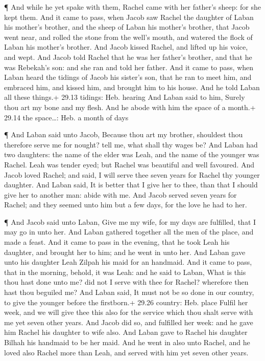  ¶ And while he yet spake with them, Rachel came with her
father's sheep: for she kept them.  And it came to pass,
when Jacob saw Rachel the daughter of Laban his mother's brother, and
the sheep of Laban his mother's brother, that Jacob went near, and
rolled the stone from the well's mouth, and watered the flock of Laban
his mother's brother.  And Jacob kissed Rachel, and lifted
up his voice, and wept.  And Jacob told Rachel that he was
her father's brother, and that he was Rebekah's son: and she ran and
told her father.  And it came to pass, when Laban heard the
tidings of Jacob his sister's son, that he ran to meet him, and embraced
him, and kissed him, and brought him to his house. And he told Laban all
these things.+ 29.13 tidings: Heb. hearing  And Laban said
to him, Surely thou art my bone and my flesh. And he abode with him the
space of a month.+ 29.14 the space\ldots: Heb. a month of days

 ¶ And Laban said unto Jacob, Because thou art my brother,
shouldest thou therefore serve me for nought? tell me, what shall thy
wages be?  And Laban had two daughters: the name of the
elder was Leah, and the name of the younger was Rachel. 
Leah was tender eyed; but Rachel was beautiful and well favoured.
 And Jacob loved Rachel; and said, I will serve thee seven
years for Rachel thy younger daughter.  And Laban said, It
is better that I give her to thee, than that I should give her to
another man: abide with me.  And Jacob served seven years
for Rachel; and they seemed unto him but a few days, for the love he had
to her.

 ¶ And Jacob said unto Laban, Give me my wife, for my days
are fulfilled, that I may go in unto her.  And Laban
gathered together all the men of the place, and made a feast.
 And it came to pass in the evening, that he took Leah his
daughter, and brought her to him; and he went in unto her. 
And Laban gave unto his daughter Leah Zilpah his maid for an handmaid.
 And it came to pass, that in the morning, behold, it was
Leah: and he said to Laban, What is this thou hast done unto me? did not
I serve with thee for Rachel? wherefore then hast thou beguiled me?
 And Laban said, It must not be so done in our country, to
give the younger before the firstborn.+ 29.26 country: Heb. place
 Fulfil her week, and we will give thee this also for the
service which thou shalt serve with me yet seven other years.
 And Jacob did so, and fulfilled her week: and he gave him
Rachel his daughter to wife also.  And Laban gave to Rachel
his daughter Bilhah his handmaid to be her maid.  And he
went in also unto Rachel, and he loved also Rachel more than Leah, and
served with him yet seven other years.

